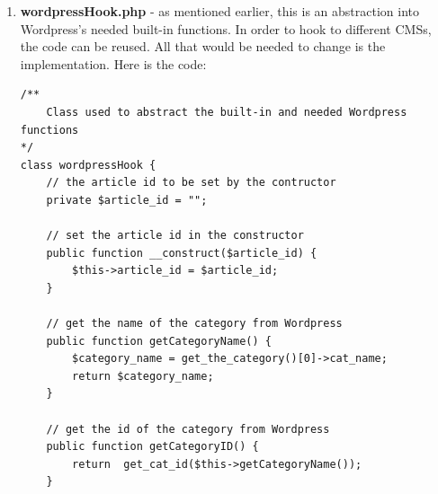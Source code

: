 \documentclass[12pt]{article}
\begin{document}
\begin{enumerate}
\begin{lstlisting}[basicstyle=\scriptsize]
	});
}

/**
	initiate the timer and the bindings on load
*/
$( document ).ready(function() {
	// have the time sent to the server once the window
	// closes or if the user navigates to another page
	if(!!window.chrome) {
		window.onbeforeunload = sendTime;
	} else {
		window.onunload = sendTime;
	}
	
	$("body").on("mousemove",function(){
		// if the user moves the mouse, start the timer. 
		// Also, cancel the event binding to both 'mousemove' and 'scroll'
		if(!mouse_moved) {
			mouse_moved = true;
			// create a new Timer object
			timer = new Timer();
			// begin counting
			timer.countTime();
		} else {
			$("body").unbind("mousemove");
			$(document).unbind("scroll");
		}
	});

	$(document).on("scroll",function(){
		// if the user starts scrolling the page, start the timer. 
		// Also, cancel the event binding to both 'mousemove' and 'scroll'
		if(page_scroll_counter == 1) {
			$("body").unbind("mousemove");
			$(document).unbind("scroll");				
		} else {
			// create a new Timer object
			timer = new Timer();
			// begin counting
			timer.countTime();
			page_scroll_counter++;
		}
	});
	
	// stop counting if user switches to another tab
	$(window).on("blur",function() {
		timer.stopCount();
	});
	
	// resume counting if user switches back to current tab
	$(window).on("focus",function() {
		timer.countTime();
	});
});
\end{lstlisting} 
\item \textbf{wordpressHook.php} - as mentioned earlier, this is an abstraction into Wordpress's needed built-in functions. In order to hook to different CMSs, the code can be reused. All that would be needed to change is the implementation. Here is the code:
\begin{lstlisting}[basicstyle=\scriptsize]
/**
	Class used to abstract the built-in and needed Wordpress functions
*/
class wordpressHook {
	// the article id to be set by the contructor
	private $article_id = "";

	// set the article id in the constructor
	public function __construct($article_id) {
		$this->article_id = $article_id;
	}
	
	// get the name of the category from Wordpress
	public function getCategoryName() {
		$category_name = get_the_category()[0]->cat_name;
		return $category_name;
	}
	
	// get the id of the category from Wordpress
	public function getCategoryID() {
		return 	get_cat_id($this->getCategoryName());
	}
	

\end{lstlisting}
\end{enumerate}
\end{document}
